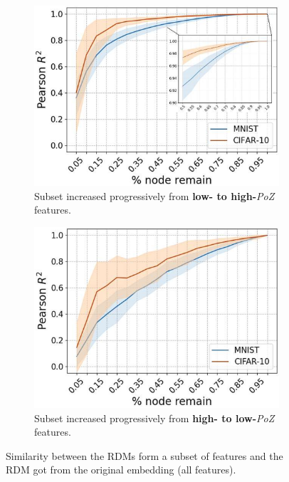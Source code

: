 \begin{figure}[!ht]
    \centering
    \captionsetup{width=.8\linewidth}
    \begin{subfigure}{.49\textwidth}
        \centering
        \captionsetup{width=.8\linewidth}
        \includegraphics[width=.7\linewidth]{images/poz_2.png}
        \caption{Subset increased progressively from \textbf{low- to high-}\textit{PoZ} features.}
        \label{fig:poz_2}
    \end{subfigure}
    \begin{subfigure}{.49\textwidth}
        \centering
        \captionsetup{width=.8\linewidth}
        \includegraphics[width=.7\linewidth]{images/poz_3.png}
        \caption{Subset increased progressively from \textbf{high- to low-}\textit{PoZ} features.}
        \label{fig:poz_3}
    \end{subfigure}
    \caption{Similarity between the RDMs form a subset of features and the RDM got from the original embedding (all features).}
    \label{fig:poz23}
\end{figure}


